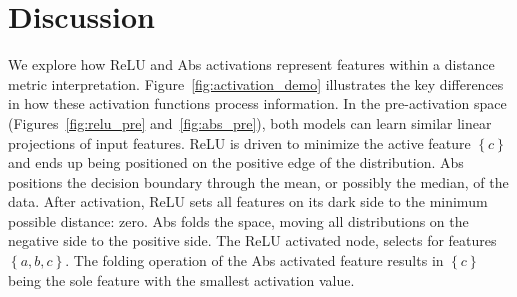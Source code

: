 \section{Discussion}

We explore how ReLU and Abs activations represent features within a distance metric interpretation. Figure~\ref{fig:activation_demo} illustrates the key differences in how these activation functions process information. In the pre-activation space (Figures~\ref{fig:relu_pre} and~\ref{fig:abs_pre}), both models can learn similar linear projections of input features. ReLU is driven to minimize the active feature $\left\{ c \right\}$ and ends up being positioned on the positive edge of the distribution. Abs positions the decision boundary through the mean, or possibly the median, of the data. After activation, ReLU sets all features on its dark side to the minimum possible distance: zero. Abs folds the space, moving all distributions on the negative side to the positive side. The ReLU activated node, selects for features $\left\{ a, b, c \right\}$. The folding operation of the Abs activated feature results in $\left\{ c \right\}$ being the sole feature with the smallest activation value.

